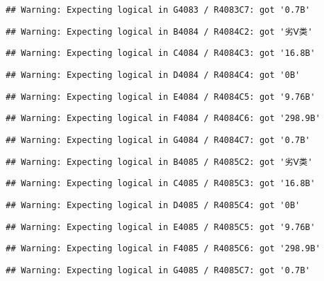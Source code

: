 \documentclass[
]{article}
\begin{document}
\begin{verbatim}
## Warning: Expecting logical in G4083 / R4083C7: got '0.7B'
\end{verbatim}

\begin{verbatim}
## Warning: Expecting logical in B4084 / R4084C2: got '劣Ⅴ类'
\end{verbatim}

\begin{verbatim}
## Warning: Expecting logical in C4084 / R4084C3: got '16.8B'
\end{verbatim}

\begin{verbatim}
## Warning: Expecting logical in D4084 / R4084C4: got '0B'
\end{verbatim}

\begin{verbatim}
## Warning: Expecting logical in E4084 / R4084C5: got '9.76B'
\end{verbatim}

\begin{verbatim}
## Warning: Expecting logical in F4084 / R4084C6: got '298.9B'
\end{verbatim}

\begin{verbatim}
## Warning: Expecting logical in G4084 / R4084C7: got '0.7B'
\end{verbatim}

\begin{verbatim}
## Warning: Expecting logical in B4085 / R4085C2: got '劣Ⅴ类'
\end{verbatim}

\begin{verbatim}
## Warning: Expecting logical in C4085 / R4085C3: got '16.8B'
\end{verbatim}

\begin{verbatim}
## Warning: Expecting logical in D4085 / R4085C4: got '0B'
\end{verbatim}

\begin{verbatim}
## Warning: Expecting logical in E4085 / R4085C5: got '9.76B'
\end{verbatim}

\begin{verbatim}
## Warning: Expecting logical in F4085 / R4085C6: got '298.9B'
\end{verbatim}

\begin{verbatim}
## Warning: Expecting logical in G4085 / R4085C7: got '0.7B'
\end{verbatim}
\end{document}

